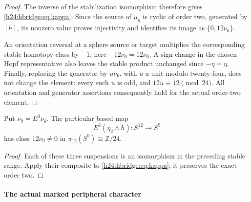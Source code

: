 \begin{proof}
The inverse of the stabilization isomorphism therefore gives
\eqref{h24:hbridge:eq:kappa}. Since the source of \(\mu_\eta\) is
cyclic of order two, generated by \([h]\), its nonzero value
proves injectivity and identifies its image as
\(\{0,12\nu_6\}\).

An orientation reversal at a sphere source or target multiplies
the corresponding stable homotopy class by \(-1\); here
\(-12\nu_6=12\nu_6\). A sign change in the chosen Hopf
representative also leaves the stable product unchanged since
\(-\eta=\eta\). Finally, replacing the generator by
\(u\nu_6\), with \(u\) a unit modulo twenty-four, does not
change the element: every such \(u\) is odd, and
\(12u\equiv12\pmod{24}\). All orientation and generator
assertions consequently hold for the actual order-two element.
\end{proof}

\begin{corollary}
Put \(\nu_9=E^3\nu_6\). The particular based map
\[
E^3(\eta_2\wedge h):S^{12}\longrightarrow S^9
\]
has class \(12\nu_9\ne0\) in
\(\pi_{12}(S^9)\cong\mathbb Z/24\).
\end{corollary}
\begin{proof}
Each of these three suspensions is an isomorphism in the preceding
stable range. Apply their composite to
\eqref{h24:hbridge:eq:kappa}; it preserves the exact order two.
\end{proof}

\paragraph{The actual marked peripheral character}

